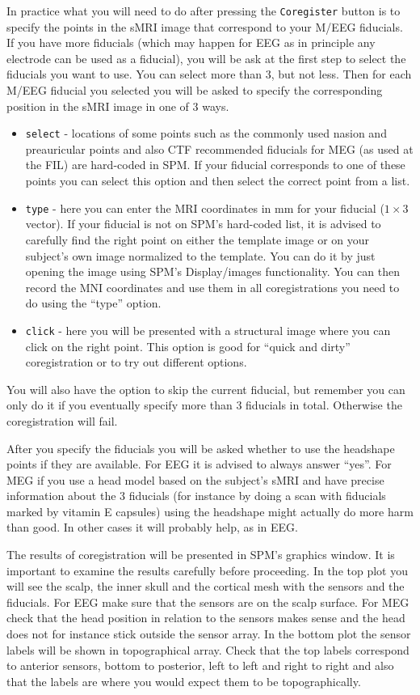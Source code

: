 In practice what you will need to do after pressing  the \texttt{Coregister} button is to specify the points in the sMRI image that correspond to your M/EEG fiducials. If you have more fiducials (which may happen for EEG as in principle any electrode can be used as a fiducial), you will be ask at the first step to select the fiducials you want to use. You can select more than 3, but not less. Then for each M/EEG fiducial you selected you will be asked to specify the corresponding position in the sMRI image in one of 3 ways.

\begin{itemize}
\item \texttt{select} - locations of some points such as the commonly used nasion and preauricular points and also CTF recommended fiducials for MEG (as used at the FIL) are hard-coded in SPM. If your fiducial corresponds to one of these points you can select this option and then select the correct point from a list.
\item \texttt{type} - here you can enter the MRI coordinates in mm for your fiducial ($1 \times 3$ vector). If your fiducial is not on SPM's hard-coded list, it is advised to carefully find the right point on either the template image or on your subject's own image normalized to the template. You can do it by just opening the image using SPM's Display/images functionality. You can then record the MNI coordinates and use them in all coregistrations you need to do using the ``type'' option.
\item \texttt{click} - here you will be presented with a structural image where you can click on the right point. This option is good for ``quick and dirty'' coregistration or to try out different options.
\end{itemize}

You will also have the option to skip the current fiducial, but remember you can only do it if you eventually specify more than 3 fiducials in total. Otherwise the coregistration will fail.

After you specify the fiducials you will be asked whether to use the headshape points if they are available. For EEG it is advised to always answer ``yes''. For MEG if you use a head model based on the subject's sMRI and have precise information about the 3 fiducials (for instance by doing a scan with fiducials marked by vitamin E capsules) using the headshape might actually do more harm than good. In other cases it will probably help, as in EEG.

The results of coregistration will be presented in SPM's graphics window. It is important to examine the results carefully before proceeding. In the top plot you will see the scalp, the inner skull and the cortical mesh with the sensors and the fiducials. For EEG make sure that the sensors are on the scalp surface. For MEG check that the head position in relation to the sensors makes sense and the head does not for instance stick outside the sensor array. In the bottom plot the sensor labels will be shown in topographical array. Check that the top labels correspond to anterior sensors, bottom to posterior, left to left and right to right and also that the labels are where you would expect them to be topographically.

